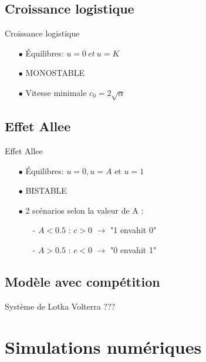 \documentclass[10pt]{beamer}
\begin{document}
\subsection{Croissance logistique}
\begin{frame}{Croissance logistique}{}
\begin{itemize}
	\item[$\bullet$] Équilibres: $u=0 {\ et\ } u=K$
	\item[$\bullet$] MONOSTABLE
	\item[$\bullet$] Vitesse minimale $c_0=2\sqrt{\alpha}$
\end{itemize}
\end{frame}

\subsection{Effet Allee}
\begin{frame}{Effet Allee}{}
\begin{itemize}
	\item[$\bullet$] Équilibres: $u=0, u=A \text{ et } u=1$
	\item[$\bullet$] BISTABLE
	\item[$\bullet$] 2 scénarios selon la valeur de A :
	\begin{itemize}
		\item[-] $A<0.5$ : $c>0$ $\rightarrow$ "1 envahit 0"
		\item[-] $A>0.5$ : $c<0$ $\rightarrow$ "0 envahit 1"
	\end{itemize}
\end{itemize}
\end{frame}

\subsection{Modèle avec compétition}
\begin{frame}{Système de Lotka Volterra}{}
???
\end{frame}

\section{Simulations numériques}
\end{document}
